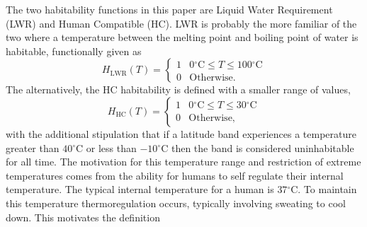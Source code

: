 \documentclass[12pt, onecolumn]{revtex4-2}    %
\newcommand{\degreesC}{\ensuremath{^{\circ}\text{C}}}
\begin{document}
The two habitability functions in this paper are Liquid Water Requirement (LWR) and Human Compatible (HC).
LWR is probably the more familiar of the two where a temperature between the melting point and boiling point of water is habitable, functionally given as
\begin{equation}
  H_\text{LWR}(T) =
  \begin{cases}
    1 & 0\degreesC \le T \le 100\degreesC \\
    0 & \text{Otherwise.}
  \end{cases}
  \label{eq:H_LWR}
\end{equation}
The alternatively, the HC habitability is defined with a smaller range of values,
\begin{equation}
  H_\text{HC}(T) =
  \begin{cases}
    1 & 0\degreesC \le T \le 30\degreesC \\
    0 & \text{Otherwise,}
  \end{cases}
  \label{eq:H_HC}
\end{equation}
with the additional stipulation that if a latitude band experiences a temperature greater than $40\degreesC$ or less than $-10\degreesC$ then the band is considered uninhabitable for all time.
The motivation for this temperature range and restriction of extreme temperatures comes from the ability for humans to self regulate their internal temperature.
The typical internal temperature for a human is $37\degreesC$.
To maintain this temperature thermoregulation occurs, typically involving sweating to cool down.
This motivates the definition 
\end{document}
